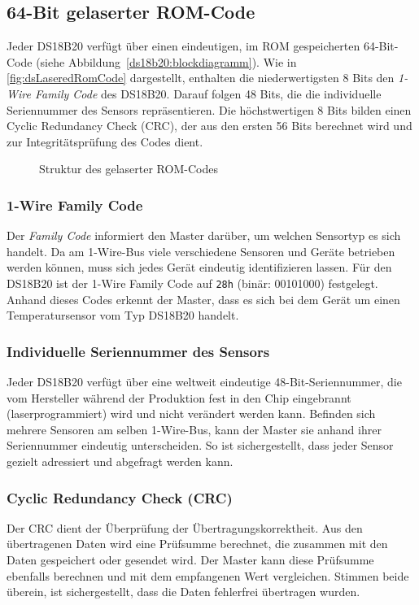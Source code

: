 	
\subsection{64-Bit gelaserter ROM-Code}
Jeder DS18B20 verfügt über einen eindeutigen, im ROM gespeicherten 64-Bit-Code (siehe Abbildung~\ref{ds18b20:blockdiagramm}). Wie in \autoref{fig:dsLaseredRomCode} dargestellt, enthalten die niederwertigsten 8 Bits den \textit{1-Wire Family Code} des DS18B20. Darauf folgen 48 Bits, die die individuelle Seriennummer des Sensors repräsentieren. Die höchstwertigen 8 Bits bilden einen Cyclic Redundancy Check (CRC), der aus den ersten 56 Bits berechnet wird und zur Integritätsprüfung des Codes dient.

	\begin{figure}[H]
		\centering
		\resizebox{\textwidth}{!}{%
			\begin{tikzpicture}
				\dsLaseredRomCode
			\end{tikzpicture}%
		}
		\caption{Struktur des gelaserter ROM-Codes}
		\label{fig:dsLaseredRomCode}
	\end{figure}

\subsubsection{1-Wire Family Code}
	Der \textit{Family Code} informiert den Master darüber, um welchen Sensortyp es sich handelt. 
	Da am 1-Wire-Bus viele verschiedene Sensoren und Geräte betrieben werden können, muss sich jedes Gerät eindeutig identifizieren lassen. 
	Für den DS18B20 ist der 1-Wire Family Code auf \texttt{28h} (binär: 00101000) festgelegt. 
	Anhand dieses Codes erkennt der Master, dass es sich bei dem Gerät um einen Temperatursensor vom Typ DS18B20 handelt.


\subsubsection{Individuelle Seriennummer des Sensors}
	Jeder DS18B20 verfügt über eine weltweit eindeutige 48-Bit-Seriennummer,  die vom Hersteller während der Produktion fest in den Chip eingebrannt (laserprogrammiert) wird und nicht verändert werden kann. Befinden sich mehrere Sensoren am selben 1-Wire-Bus, kann der Master sie anhand ihrer Seriennummer eindeutig unterscheiden. So ist sichergestellt, dass jeder Sensor gezielt adressiert und abgefragt werden kann. 
		

\subsubsection{Cyclic Redundancy Check (CRC)}
	Der CRC dient der Überprüfung der Übertragungskorrektheit. Aus den übertragenen Daten wird eine Prüfsumme berechnet, die zusammen mit den Daten gespeichert oder gesendet wird. Der Master kann diese Prüfsumme ebenfalls berechnen und mit dem empfangenen Wert vergleichen. Stimmen beide überein, ist sichergestellt, dass die Daten fehlerfrei übertragen wurden.  

